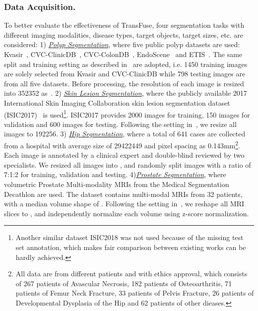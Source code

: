 \documentclass[runningheads]{llncs}
\begin{document}
\subsubsection{Data Acquisition.}To better evaluate the effectiveness of TransFuse, four segmentation tasks with different imaging modalities, disease types, target objects, target sizes, etc. are considered: 1) \textit{\underline{Polyp Segmentation}}, where five public polyp datasets are used: Kvasir~\cite{jha2020kvasir}, CVC-ClinicDB~\cite{bernal2015wm}, CVC-ColonDB~\cite{tajbakhsh2015automated},
EndoScene~\cite{vazquez2017benchmark} and ETIS~\cite{silva2014toward}. The same split and training setting as described in~\cite{fan2020pranet,huang2021hardnet} are adopted, i.e. 1450 training images are solely selected from Kvasir and CVC-ClinicDB while 798 testing images are from all five datasets. Before processing, the resolution of each image is resized into 352352 as~\cite{fan2020pranet,huang2021hardnet}. 2) \textit{\underline{Skin Lesion Segmentation}}, where the publicly available 2017 International Skin Imaging Collaboration skin lesion segmentation dataset (ISIC2017)~\cite{codella2018skin} is used\footnote{Another similar dataset ISIC2018 was not used because of the missing test set annotation, which makes fair comparison between existing works can be hardly achieved.
}. ISIC2017 provides 2000 images for training, 150 images for validation and 600 images for testing. 
Following the setting in~\cite{al2018skin}, we resize all images to 192256.  3) \textit{\underline{Hip Segmentation}}, where a total of 641 cases are collected from a hospital with average size of 29422449 and pixel spacing as 0.143mm\footnote{All data are from different patients and with ethics approval, which consists of 267 patients of Avascular Necrosis, 182 patients of Osteoarthritis, 71 patients of Femur Neck Fracture, 33 patients of Pelvis Fracture, 26 patients of Developmental Dysplasia of the Hip and 62 patients of other dieases.}. Each image is annotated by a clinical expert and double-blind reviewed by two specialists. We resized all images into , and randomly split images with a ratio of 7:1:2 for training, validation and testing. 4)\textit{\underline{Prostate Segmentation}}, where volumetric Prostate Multi-modality MRIs from the Medical Segmentation Decathlon \cite{simpson2019large} are used. The dataset contains multi-modal MRIs from 32 patients, with a median volume shape of . Following the setting in~\cite{isensee2019automated}, we reshape all MRI slices to , and independently normalize each volume using z-score normalization.
\end{document}
